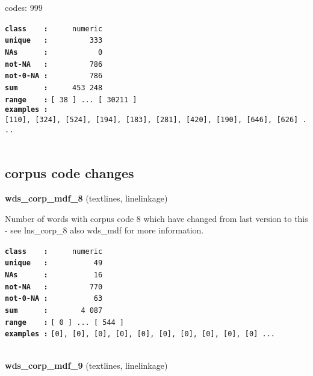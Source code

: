 \documentclass[]{article}
\begin{document}
codes: 999

\textbf{\texttt{class\ \ \ \ :}} \texttt{~~~~~numeric}\\
\textbf{\texttt{unique\ \ \ :}} \texttt{~~~~~~~~~333}\\
\textbf{\texttt{NAs\ \ \ \ \ \ :}} \texttt{~~~~~~~~~~~0}\\
\textbf{\texttt{not-NA\ \ \ :}} \texttt{~~~~~~~~~786}\\
\textbf{\texttt{not-0-NA\ :}} \texttt{~~~~~~~~~786}\\
\textbf{\texttt{sum\ \ \ \ \ \ :}} \texttt{~~~~~453~248}\\
\textbf{\texttt{range\ \ \ \ :}}
\texttt{{[}\ 38\ {]}\ ...\ {[}\ 30211\ {]}}\\
\textbf{\texttt{examples\ :}}
\texttt{{[}110{]},\ {[}324{]},\ {[}524{]},\ {[}194{]},\ {[}183{]},\ {[}281{]},\ {[}420{]},\ {[}190{]},\ {[}646{]},\ {[}626{]}\ ...}\\

~

\subsection{corpus code changes}\label{corpus-code-changes}

\textbf{wds\_corp\_mdf\_8} (textlines, linelinkage)

Number of words with corpus code 8 which have changed from last version
to this - see lns\_corp\_8 also wds\_mdf for more information.

\textbf{\texttt{class\ \ \ \ :}} \texttt{~~~~~numeric}\\
\textbf{\texttt{unique\ \ \ :}} \texttt{~~~~~~~~~~49}\\
\textbf{\texttt{NAs\ \ \ \ \ \ :}} \texttt{~~~~~~~~~~16}\\
\textbf{\texttt{not-NA\ \ \ :}} \texttt{~~~~~~~~~770}\\
\textbf{\texttt{not-0-NA\ :}} \texttt{~~~~~~~~~~63}\\
\textbf{\texttt{sum\ \ \ \ \ \ :}} \texttt{~~~~~~~4~087}\\
\textbf{\texttt{range\ \ \ \ :}}
\texttt{{[}\ 0\ {]}\ ...\ {[}\ 544\ {]}}\\
\textbf{\texttt{examples\ :}}
\texttt{{[}0{]},\ {[}0{]},\ {[}0{]},\ {[}0{]},\ {[}0{]},\ {[}0{]},\ {[}0{]},\ {[}0{]},\ {[}0{]},\ {[}0{]}\ ...}\\

~

\textbf{wds\_corp\_mdf\_9} (textlines, linelinkage)
\end{document}
